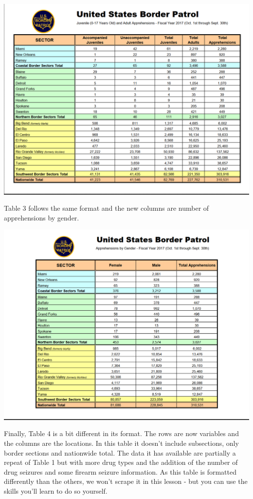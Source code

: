 \documentclass[
  12pt,
]{book}
\begin{document}
\includegraphics{images/pdf_table_2.PNG}

Table 3 follows the same format and the new columns are number of apprehensions by gender.

\includegraphics{images/pdf_table_3.PNG}

Finally, Table 4 is a bit different in its format. The rows are now variables and the columns are the locations. In this table it doesn't include subsections, only border sections and nationwide total. The data it has available are partially a repeat of Table 1 but with more drug types and the addition of the number of drug seizures and some firearm seizure information. As this table is formatted differently than the others, we won't scrape it in this lesson - but you can use the skills you'll learn to do so yourself.
\end{document}
